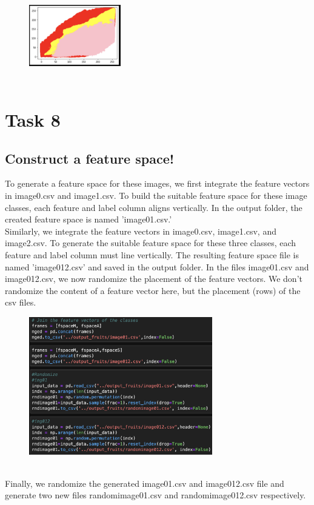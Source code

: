 \documentclass[conference]{IEEEtran}
\begin{document}
\begin{figure}[!htbp]
    \centering
    \includegraphics[height=4cm,width=4cm]{Task7-scatter.png} 
   
    \label{fig:my_label}
\end{figure}





\section{Task 8}
\subsection{Construct a feature space!}
To generate a feature space for these images, we first integrate the feature vectors in image0.csv and image1.csv. To build the suitable feature space for these image classes, each feature and label column aligns vertically. In the output folder, the created feature space is named 'image01.csv.'
\\ Similarly, we integrate the feature vectors in image0.csv, image1.csv, and image2.csv. To generate the suitable feature space for these three classes, each feature and label column must line vertically. The resulting feature space file is named 'image012.csv' and saved in the output folder.
In the files image01.csv and image012.csv, we now randomize the placement of the feature vectors. We don't randomize the content of a feature vector here, but the placement (rows) of the csv files. 
\begin{figure}[!htbp]
    \centering
    \includegraphics[height=6cm]{Task8.png} 
   
    \label{fig:my_label}
\end{figure}
\\Finally, we randomize the generated image01.csv and image012.csv file and generate two new files randomimage01.csv and randomimage012.csv respectively.\\
\end{document}
